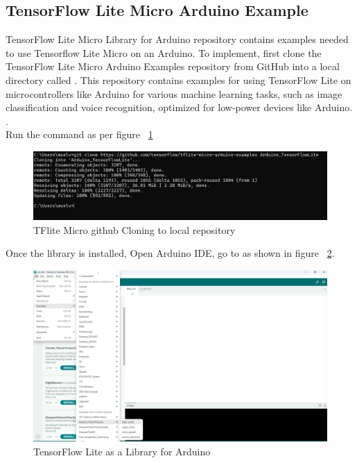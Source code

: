 \subsection{TensorFlow Lite Micro Arduino Example}
TensorFlow Lite Micro Library for Arduino repository contains examples needed to use Tensorflow Lite Micro on an Arduino. To implement, first clone the TensorFlow Lite Micro Arduino Examples repository from GitHub into a local directory called . This repository contains examples for using TensorFlow Lite on microcontrollers like Arduino for various machine learning tasks, such as image classification and voice recognition, optimized for low-power devices like Arduino. \cite{tensorflowblog:2024}. 
\\Run the command  as per figure ~\ref{Clone}

\begin{figure}
	\begin{center}
		\includegraphics[width=0.7\linewidth]{Images/TensorFlowLite/TFLiteMicro.png}
		\caption{TFlite Micro github Cloning to local repository}
		\label{Clone}
	\end{center}
\end{figure}

Once the library is installed, Open Arduino IDE, go to  as shown in figure ~\ref{TFLlib}.

\begin{figure}
	\begin{center}
		\includegraphics[width=0.7\linewidth]{Images/TensorFlowLite/helloWorld.png}
		\caption{TensorFlow Lite as a Library for Arduino}
		\label{TFLlib}
	\end{center}
\end{figure}

